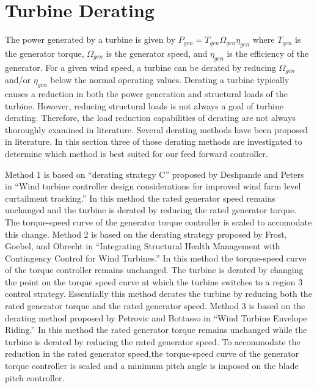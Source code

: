 
\section{Turbine Derating} \label{section4-2}

The power generated by a turbine is given by $P_{gen} = T_{gen}\Omega_{gen}\eta_{gen}$ where $T_{gen}$ is the generator torque, $\Omega_{gen}$ is the generator speed, and $\eta_{gen}$ is the efficiency of the generator. For a given wind speed, a turbine can be derated by reducing $\Omega_{gen}$ and/or $\eta_{gen}$ below the normal operating values. Derating a turbine typically causes a reduction in both the power generation and structural loads of the turbine. However, reducing structural loads is not always a goal of turbine derating. Therefore, the load reduction capabilities of derating are not always thoroughly examined in literature. Several derating methods have been proposed in literature. In this section three of those derating methods are investigated to determine which method is best suited for our feed forward controller.

Method 1 is based on ``derating strategy C'' proposed by Deshpande and Peters in ``Wind turbine controller design considerations for improved wind farm level curtailment tracking.''\cite{deshpande2012} In this method the rated generator speed remains unchanged and the turbine is derated by reducing the rated generator torque. The torque-speed curve of the generator torque controller is scaled to accomodate this change. Method 2 is based on the derating strategy proposed by Frost, Goebel, and Obrecht in ``Integrating Structural Health Management with Contingency Control for Wind Turbines.''\cite{frost2013} In this method the torque-speed curve of the torque controller remains unchanged. The turbine is derated by changing the point on the torque speed curve at which the turbine switches to a region 3 control strategy. Essentially this method derates the turbine by reducing both the rated generator torque and the rated generator speed. Method 3 is based on the derating method proposed by Petrovic and Bottasso in ``Wind Turbine Envelope Riding.''\cite{petrovic2015} In this method the rated generator torque remains unchanged while the turbine is derated by reducing the rated generator speed. To accommodate the reduction in the rated generator speed,the torque-speed curve of the generator torque controller is scaled and a minimum pitch angle is imposed on the blade pitch controller.


